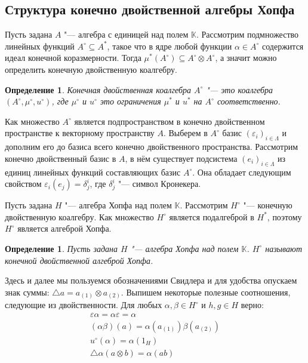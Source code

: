 \documentclass[12pt, reqno, a4paper, oneside, notitlepage]{amsart}
\theoremstyle{mytheoremstyle}
\theoremstyle{myremarkstyle}
\newtheorem{definition}[theorem]{Определение}
\numberwithin{equation}{section}
\begin{document}
\newpage

\subsection{Структура конечно двойственной алгебры Хопфа}

Пусть задана $A$ "--- алгебра с единицей над полем $\mathbb{K}$. Рассмотрим подмножество линейных функций $A^\circ \subseteq A^*$, такое что в ядре любой функции $\alpha \in A^\circ$ содержится идеал конечной коразмерности. Тогда $\mu^*(A^\circ) \subseteq A^\circ \otimes A^\circ$, а значит можно определить конечную двойственную коалгебру.

\begin{definition}
    Конечная двойственная коалгебра $A^\circ$ "--- это коалгебра $(A^\circ, \mu^\circ, u^\circ)$, где $\mu^\circ$ и $u^\circ$ это ограничения $\mu^*$ и $u^*$ на $A^\circ$ соответственно.
\end{definition}

Как множество $A^\circ$ является подпространством в конечно двойственном пространстве к векторному пространству $A$. 
Выберем в $A^\circ$ базис $(\varepsilon_i)_{i \in \Lambda}$ и дополним его до базиса всего конечно двойственного пространства.
Рассмотрим конечно двойственный базис в $A$, в нём существует подсистема $(e_i)_{i \in \Lambda}$ из единиц линейных функций составляющих базис $A^\circ$. Она обладает следующим свойством $\varepsilon_i(e_j) = \delta^i_j$, где $\delta^i_j$ "--- символ Кронекера.

Пусть задана $H$ "--- алгебра Хопфа над полем $\mathbb{K}$. Рассмотрим $H^\circ$ "--- конечную двойственную коалгебру. Как множество $H^\circ$ является подалгеброй в $H^*$, поэтому $H^\circ$ является алгеброй Хопфа.

\begin{definition}
    Пусть задана $H$ "--- алгебра Хопфа над полем $\mathbb{K}$. $H^\circ$ называют конечной двойственной алгеброй Хопфа.
\end{definition}

Здесь и далее мы пользуемся обозначениями Свидлера и для удобства опускаем знак суммы: $\bigtriangleup a = a_{(1)} \otimes a_{(2)}$. 
Выпишем некоторые полезные соотношения, следующие из двойственности. Для любых $\alpha, \beta \in H^\circ$ и $h, g \in H$ верно:
\begin{eqnarray}
    \varepsilon\alpha = \alpha\varepsilon = \alpha \label{str1}\\
    (\alpha\beta)(a) = \alpha(a_{(1)})\beta(a_{(2)}) \label{str2}\\
    u^\circ(\alpha) = \alpha(1_H) \label{str3}\\
    \bigtriangleup\alpha(a \otimes b) = \alpha(ab) \label{str4}
\end{eqnarray}
\end{document}
